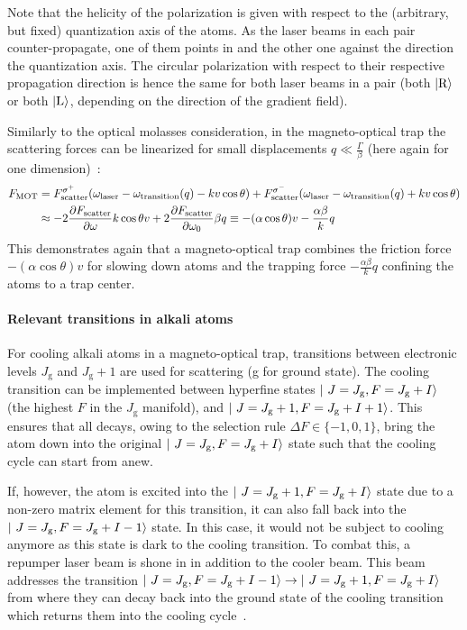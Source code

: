 Note that the helicity of the polarization is given with respect to the (arbitrary, but fixed) quantization axis of the atoms. As the laser beams in each pair counter-propagate, one of them points in and the other one against the direction the quantization axis. The circular polarization with respect to their respective propagation direction is hence the same for both laser beams in a pair (both $\Ket{\text{R}}$ or both $\Ket{\text{L}}$, depending on the direction of the gradient field).


Similarly to the optical molasses consideration, in the magneto-optical trap the scattering forces can be linearized for small displacements $q \ll \frac{\Gamma}{\beta}$ (here again for one dimension)~\cite{foot_atomic_2005}:
\begin{equation}\label{eq:mot_force}
    \begin{split}
        F_\text{MOT} &= F_\text{scatter}^{\sigma^+}(\omega_\text{laser} - \omega_\text{transition}(q) - kv \cos \theta) + F_\text{scatter}^{\sigma^-}(\omega_\text{laser} - \omega_\text{transition}(q) + kv \cos \theta)\\
        &\approx -2 \pdv{F_\text{scatter}}{\omega} k\cos \theta v + 2 \pdv{F_\text{scatter}}{\omega_0} \beta q  \equiv - (\alpha \cos \theta) v - \frac{\alpha \beta}{k} q
    \end{split}
\end{equation}
This demonstrates again that a magneto-optical trap combines the friction force $-(\alpha \cos \theta) v$ for slowing down atoms and the trapping force $- \frac{\alpha \beta}{k} q$ confining the atoms to a trap center.

\paragraph{Relevant transitions in alkali atoms}
\sloppy For cooling alkali atoms in a magneto-optical trap, transitions between electronic levels $J_\text{g}$ and $J_\text{g} + 1$ are used for scattering (g for ground state). The cooling transition can be imple\-mented between hyperfine states $\Ket{~J = J_\text{g}, F = J_\text{g} + I}$ (the highest $F$ in the $J_\text{g}$ manifold), and $\Ket{~J = J_\text{g} + 1, F= J_\text{g} + I + 1}$. This ensures that all decays, owing to the selection rule $\Delta F \in \{-1, 0, 1\}$,  bring the atom down into the original $\Ket{~J = J_\text{g}, F = J_\text{g} + I}$ state such that the cooling cycle can start from anew.

If, however, the atom is excited into the $\Ket{~J = J_\text{g} + 1, F = J_\text{g} + I}$ state due to a non-zero matrix element for this transition, it can also fall back into the $\Ket{~J = J_\text{g}, F = J_\text{g} + I - 1}$ state. In this case, it would not be subject to cooling anymore as this state is dark to the cooling transition. To combat this, a repumper laser beam is shone in in addition to the cooler beam. This beam addresses the transition $\Ket{~J = J_\text{g}, F = J_\text{g} + I - 1} \rightarrow \Ket{~J = J_\text{g} + 1, F = J_\text{g} + I}$ from where they can decay back into the ground state of the cooling transition which returns them into the cooling cycle~\cite{metcalf_laser_1999}.

